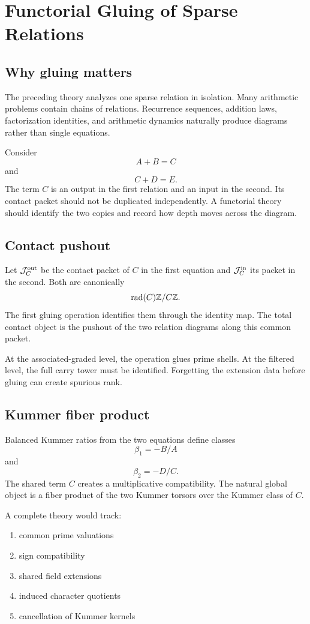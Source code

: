 \chapter{Functorial Gluing of Sparse Relations}

\section{Why gluing matters}
The preceding theory analyzes one sparse relation in isolation. Many arithmetic problems contain chains of relations. Recurrence sequences, addition laws, factorization identities, and arithmetic dynamics naturally produce diagrams rather than single equations.

Consider
\[
 A+B=C
\]
and
\[
 C+D=E.
\]
The term $C$ is an output in the first relation and an input in the second. Its contact packet should not be duplicated independently. A functorial theory should identify the two copies and record how depth moves across the diagram.

\section{Contact pushout}
Let $\mathcal J_C^{\mathrm{out}}$ be the contact packet of $C$ in the first equation and $\mathcal J_C^{\mathrm{in}}$ its packet in the second. Both are canonically
\[
 \operatorname{rad}(C)\mathbb Z/C\mathbb Z.
\]
The first gluing operation identifies them through the identity map. The total contact object is the pushout of the two relation diagrams along this common packet.

At the associated-graded level, the operation glues prime shells. At the filtered level, the full carry tower must be identified. Forgetting the extension data before gluing can create spurious rank.

\section{Kummer fiber product}
Balanced Kummer ratios from the two equations define classes
\[
 \beta_1=-B/A
\]
and
\[
 \beta_2=-D/C.
\]
The shared term $C$ creates a multiplicative compatibility. The natural global object is a fiber product of the two Kummer torsors over the Kummer class of $C$.

A complete theory would track:

\begin{enumerate}[leftmargin=1.5em]
\item common prime valuations
\item sign compatibility
\item shared field extensions
\item induced character quotients
\item cancellation of Kummer kernels
\end{enumerate}

